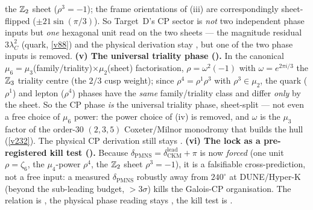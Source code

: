 \begin{winbox}
the $\mathbb{Z}_2$ sheet ($\rho^3=-1$); the frame orientations of (iii) are correspondingly sheet-flipped
($\pm21\sin(\pi/3)$). So Target~D's CP sector is \emph{not} two independent phase inputs but \emph{one}
hexagonal unit read on the two sheets --- the magnitude residual $3\lambda_C^2$ (quark, \vref{v88}) and the
physical derivation stay \mC, but one of the two phase inputs is removed. \textbf{(v) The universal triality
phase ().} In the canonical $\mu_6=\mu_3$(family/triality)$\times\mu_2$(sheet)
factorisation, $\rho=\omega^2(-1)$ with $\omega=e^{2\pi i/3}$ the $\mathbb{Z}_3$ triality centre (the $2/3$ cusp
weight); since $\rho^4=\rho^1\rho^3$ with $\rho^3\in\mu_2$, the quark ($\rho^1$) and lepton ($\rho^4$) phases
have the \emph{same} family/triality class and differ \emph{only} by the sheet. So the CP phase \emph{is} the
universal triality phase, sheet-split --- not even a free choice of $\mu_6$ power: the power choice of (iv)
is removed, and $\omega$ is the $\mu_3$ factor of the order-$30$ $(2,3,5)$ Coxeter/Milnor monodromy that
builds the hull (\vref{v232}). The physical CP derivation still stays \mC.
\textbf{(vi) The lock as a pre-registered kill test ().} Because
$\delta_{\mathrm{PMNS}}=\delta_{\mathrm{CKM}}^{\mathrm{lead}}+\pi$ is now \emph{forced} (one unit $\rho=\zeta_6$,
the $\mu_4$-power $\rho^4$, the $\mathbb{Z}_2$ sheet $\rho^3{=}-1$), it is a falsifiable cross-prediction, not a free
input: a measured $\delta_{\mathrm{PMNS}}$ robustly away from $240^\circ$ at DUNE/Hyper-K (beyond the sub-leading
budget, $>3\sigma$) kills the Galois-CP organisation. The relation is \mE, the physical phase reading stays \mC,
the kill test is \mX.
\end{winbox}

